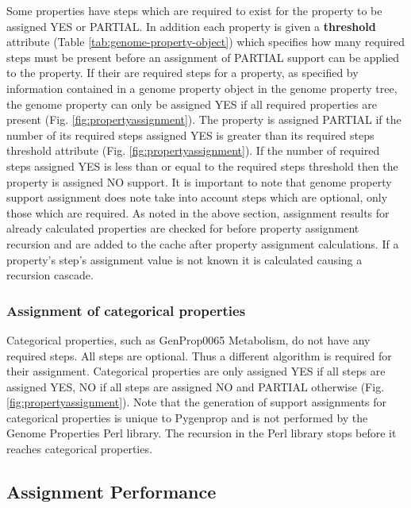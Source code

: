 Some properties have steps which are required to exist for the property to be assigned YES or PARTIAL. In addition each property is given a \textbf{threshold} attribute (Table \ref{tab:genome-property-object}) which specifies how many required steps must be present before an assignment of PARTIAL support can be applied to the property. If their are required steps for a property, as specified by information contained in a genome property object in the genome property tree, the genome property can only be assigned YES if all required properties are present (Fig. \ref{fig:propertyassignment}). The property is assigned PARTIAL if the number of its required steps assigned YES is greater than its required steps threshold attribute (Fig. \ref{fig:propertyassignment}). If the number of required steps assigned YES is less than or equal to the required steps threshold then the property is assigned NO support. It is important to note that genome property support assignment does note take into account steps which are optional, only those which are required. As noted in the above section, assignment results for already calculated properties are checked for before property assignment recursion and are added to the cache after property assignment calculations. If a property's step's assignment value is not known it is calculated causing a recursion cascade.

\subsubsection{Assignment of categorical properties}

Categorical properties, such as GenProp0065 Metabolism, do not have any required steps. All steps are optional. Thus a different algorithm is required for their assignment. Categorical properties are only assigned YES if all steps are assigned YES, NO if all steps are assigned NO and PARTIAL otherwise (Fig. \ref{fig:propertyassignment}). Note that the generation of support assignments for categorical properties is unique to Pygenprop and is not performed by the Genome Properties Perl library. The recursion in the Perl library stops before it reaches categorical properties.

\subsection{Assignment Performance}

